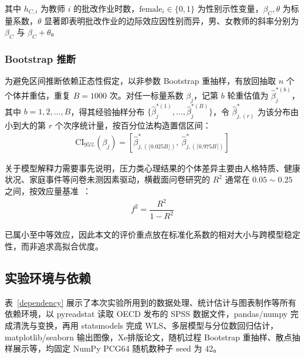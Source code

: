 \documentclass[zihao = -4, linespread = 1.5]{article}
\begin{document}
其中 $h_{C,i}$ 为教师 $i$ 的批改作业时数，$\mathrm{female}_i\in\{0,1\}$ 为性别示性变量，$\beta_C,\theta$ 为标量系数，$\theta$ 显著即表明批改作业的边际效应因性别而异，男、女教师的斜率分别为 $\beta_C$ 与 $\beta_C+\theta$。



\subsubsection{Bootstrap 推断}
为避免区间推断依赖正态性假定，以非参数 Bootstrap 重抽样，有放回抽取 $n$ 个个体并重估，重复 $B=1000$ 次。对任一标量系数 $\beta_j$，记第 $b$ 轮重估值为 $\hat\beta_j^{*(b)}$，其中 $b=1,2,\ldots,B$，得其经验抽样分布 $\{\hat\beta_j^{*(1)},\dots,\hat\beta_j^{*(B)}\}$，令 $\hat\beta_{j,(r)}^{*}$ 为该分布由小到大的第 $r$ 个次序统计量，按百分位法构造置信区间：
\begin{align}
    \mathrm{CI}_{95\%}(\beta_j)=\left[\hat\beta_{j,(\lfloor 0.025B\rfloor)}^{*},\ \hat\beta_{j,(\lceil 0.975B\rceil)}^{*}\right]
\end{align}

关于模型解释力需要事先说明，压力类心理结果的个体差异主要由人格特质、健康状况、家庭事件等问卷未测因素驱动，横截面问卷研究的 $R^2$ 通常在 $0.05\sim0.25$ 之间，按效应量基准~\citep{Cohen}：
\begin{align}
    f^2=\dfrac{R^2}{1-R^2}
\end{align}

已属小至中等效应，因此本文的评价重点放在标准化系数的相对大小与跨模型稳定性，而非追求高拟合优度。



\subsection{实验环境与依赖}
表~\ref{dependency} 展示了本次实验所用到的数据处理、统计估计与图表制作等所有依赖环境，以 pyreadstat 读取 OECD 发布的 SPSS 数据文件，pandas/numpy 完成清洗与变换，再用 statsmodels 完成 WLS、多层模型与分位数回归估计，matplotlib/seaborn 输出图像，Xe\LaTeXe 排版论文，随机过程 Bootstrap 重抽样、散点抽样展示等，均固定 NumPy PCG64 随机数种子 seed 为 42。
\end{document}
